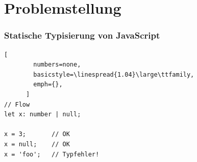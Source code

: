 




  \section{Problemstellung}


    \begin{frame}[fragile]
      \frametitle{Statische Typisierung von JavaScript}
      \begin{lstlisting}[
        numbers=none,
        basicstyle=\linespread{1.04}\large\ttfamily,
        emph={},
      ]
// Flow
let x: number | null;

x = 3;       // OK
x = null;    // OK
x = 'foo';   // Typfehler!
      \end{lstlisting}
    \end{frame}

